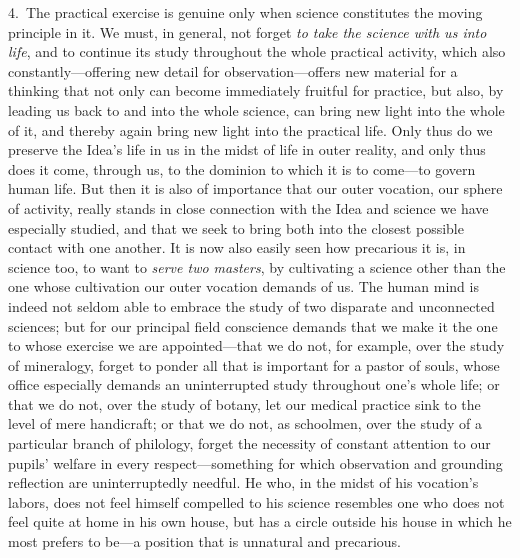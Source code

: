 \documentclass[12pt,a4paper]{book}
\begin{document}
4.~The practical exercise is genuine only when science constitutes the moving principle
in it. We must, in general, not forget \emph{to take the science with us into life}, and
to continue its study throughout the whole practical activity, which also
constantly---offering new detail for observation---offers new material for a thinking
that not only can become immediately fruitful for practice, but also, by leading us back
to and into the whole science, can bring new light into the whole of it, and thereby
again bring new light into the practical life. Only thus do we preserve the Idea's life
in us in the midst of life in outer reality, and only thus does it come, through us, to
the dominion to which it is to come---to govern human life. But then it is also of
importance that our outer vocation, our sphere of activity, really stands in close
connection with the Idea and science we have especially studied, and that we seek to
bring both into the closest possible contact with one another. It is now also easily seen
how precarious it is, in science too, to want to \emph{serve two masters}, by cultivating
a science other than the one whose cultivation our outer vocation demands of us. The human
mind is indeed not seldom able to embrace the study of two disparate and unconnected
sciences; but for our principal field conscience demands that we make it the one to whose
exercise we are appointed---that we do not, for example, over the study of mineralogy,
forget to ponder all that is important for a pastor of souls, whose office especially
demands an uninterrupted study throughout one's whole life; or that we do not, over the
study of botany, let our medical practice sink to the level of mere handicraft; or that
we do not, as schoolmen, over the study of a particular branch of philology, forget the
necessity of constant attention to our pupils' welfare in every respect---something for
which observation and grounding reflection are uninterruptedly needful. He who, in the
midst of his vocation's labors, does not feel himself compelled to his science resembles
one who does not feel quite at home in his own house, but has a circle outside his house
in which he most prefers to be---a position that is unnatural and precarious.
\end{document}
